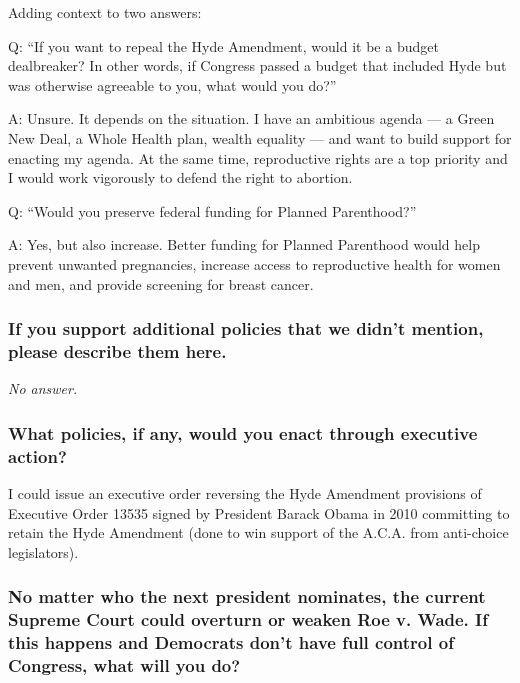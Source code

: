 Adding context to two answers:

Q: ``If you want to repeal the Hyde Amendment, would it be a budget
dealbreaker? In other words, if Congress passed a budget that included
Hyde but was otherwise agreeable to you, what would you do?''

A: Unsure. It depends on the situation. I have an ambitious agenda --- a
Green New Deal, a Whole Health plan, wealth equality --- and want to
build support for enacting my agenda. At the same time, reproductive
rights are a top priority and I would work vigorously to defend the
right to abortion.

Q: ``Would you preserve federal funding for Planned Parenthood?''

A: Yes, but also increase. Better funding for Planned Parenthood would
help prevent unwanted pregnancies, increase access to reproductive
health for women and men, and provide screening for breast cancer.

\hypertarget{if-you-support-additional-policies-that-we-didnt-mention-please-describe-them-here-8}{%
\subsubsection{If you support additional policies that we didn't
mention, please describe them
here.}\label{if-you-support-additional-policies-that-we-didnt-mention-please-describe-them-here-8}}

\emph{No answer.}

\hypertarget{what-policies-if-any-would-you-enact-through-executive-action-8}{%
\subsubsection{What policies, if any, would you enact through executive
action?}\label{what-policies-if-any-would-you-enact-through-executive-action-8}}

I could issue an executive order reversing the Hyde Amendment provisions
of Executive Order 13535 signed by President Barack Obama in 2010
committing to retain the Hyde Amendment (done to win support of the
A.C.A. from anti-choice legislators).

\hypertarget{no-matter-who-the-next-president-nominates-the-current-supreme-court-could-overturn-or-weaken-roe-v-wade-if-this-happens-and-democrats-dont-have-full-control-of-congress-what-will-you-do-8}{%
\subsubsection{No matter who the next president nominates, the current
Supreme Court could overturn or weaken Roe v. Wade. If this happens and
Democrats don't have full control of Congress, what will you
do?}\label{no-matter-who-the-next-president-nominates-the-current-supreme-court-could-overturn-or-weaken-roe-v-wade-if-this-happens-and-democrats-dont-have-full-control-of-congress-what-will-you-do-8}}

